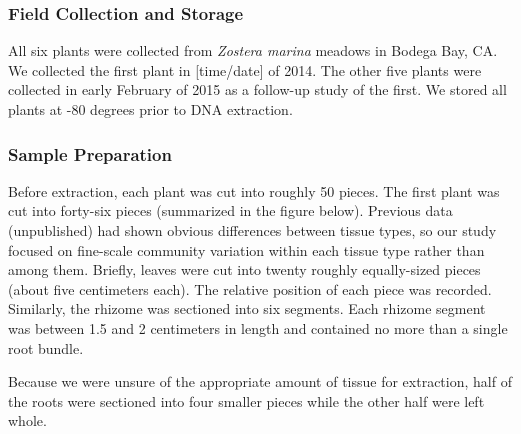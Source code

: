 
\subsubsection{\textbf{Field Collection and Storage}}

    All six plants were collected from \textit{Zostera marina} meadows in Bodega Bay, CA. We collected the first plant in [time/date] of 2014. The other five plants were collected in early February of 2015 as a follow-up study of the first. We stored all plants at -80 degrees prior to DNA extraction. 

\subsubsection{\textbf{Sample Preparation}}

    Before extraction, each plant was cut into roughly 50 pieces. The first plant was cut into forty-six pieces (summarized in the figure below). Previous data (unpublished) had shown obvious differences between tissue types, so our study focused on fine-scale community variation within each tissue type rather than among them. Briefly, leaves were cut into twenty roughly equally-sized pieces (about five centimeters each). The relative position of each piece was recorded. Similarly, the rhizome was sectioned into six segments. Each rhizome segment was between 1.5 and 2 centimeters in length and contained no more than a single root bundle.

    Because we were unsure of the appropriate amount of tissue for extraction, half of the roots were sectioned into four smaller pieces while the other half were left whole.  
    
    
    
    
    
    